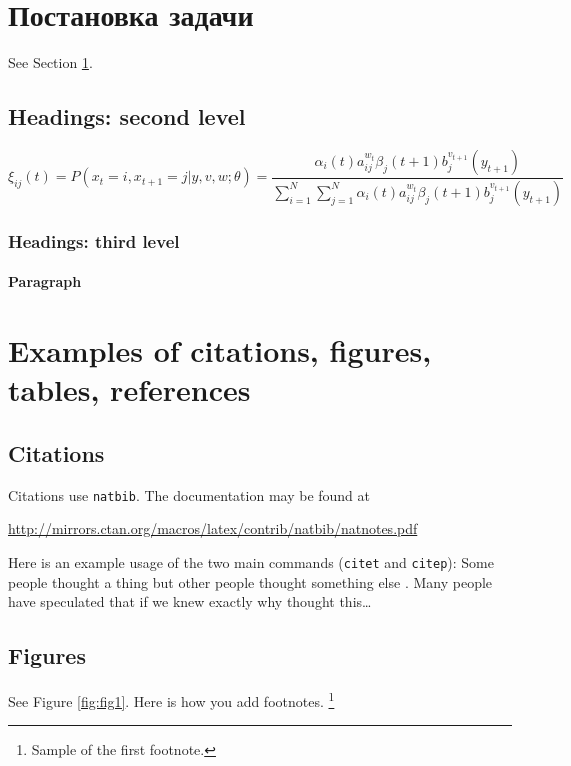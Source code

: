\documentclass{article}
\begin{document}
\section{Постановка задачи}
\label{sec:headings}

\lipsum[4] See Section \ref{sec:headings}.

\subsection{Headings: second level}
\lipsum[5]
\begin{equation}
	\xi _{ij}(t)=P(x_{t}=i,x_{t+1}=j|y,v,w;\theta)= {\frac {\alpha _{i}(t)a^{w_t}_{ij}\beta _{j}(t+1)b^{v_{t+1}}_{j}(y_{t+1})}{\sum _{i=1}^{N} \sum _{j=1}^{N} \alpha _{i}(t)a^{w_t}_{ij}\beta _{j}(t+1)b^{v_{t+1}}_{j}(y_{t+1})}}
\end{equation}

\subsubsection{Headings: third level}
\lipsum[6]

\paragraph{Paragraph}
\lipsum[7]



\section{Examples of citations, figures, tables, references}
\label{sec:others}

\subsection{Citations}
Citations use \verb+natbib+. The documentation may be found at
\begin{center}
	\url{http://mirrors.ctan.org/macros/latex/contrib/natbib/natnotes.pdf}
\end{center}

Here is an example usage of the two main commands (\verb+citet+ and \verb+citep+): Some people thought a thing \citep{kour2014real, hadash2018estimate} but other people thought something else \citep{kour2014fast}. Many people have speculated that if we knew exactly why \citet{kour2014fast} thought this\dots

\subsection{Figures}
\lipsum[10]
See Figure \ref{fig:fig1}. Here is how you add footnotes. \footnote{Sample of the first footnote.}
\lipsum[11]
\end{document}
